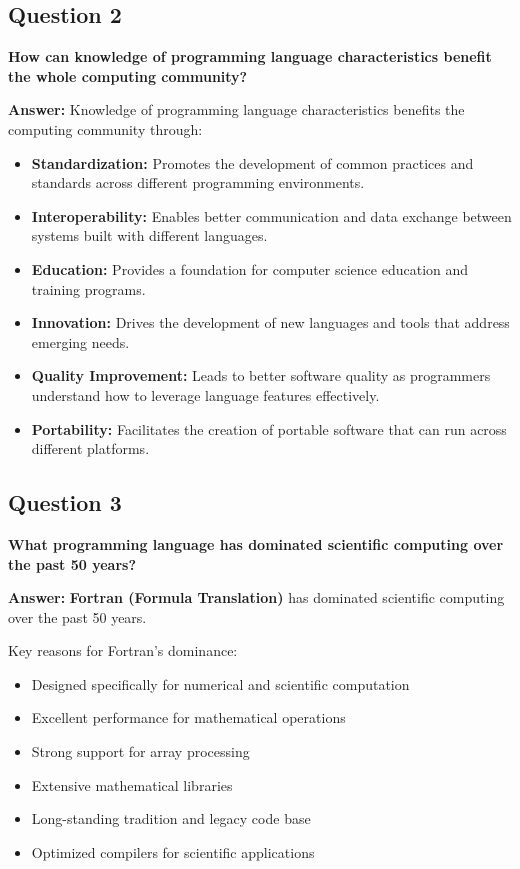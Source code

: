 \documentclass[11pt,a4paper]{article}
\begin{document}
\subsection{Question 2}
\textbf{How can knowledge of programming language characteristics benefit the whole computing community?}

\textbf{Answer:}
Knowledge of programming language characteristics benefits the computing community through:

\begin{itemize}
\item \textbf{Standardization:} Promotes the development of common practices and standards across different programming environments.

\item \textbf{Interoperability:} Enables better communication and data exchange between systems built with different languages.

\item \textbf{Education:} Provides a foundation for computer science education and training programs.

\item \textbf{Innovation:} Drives the development of new languages and tools that address emerging needs.

\item \textbf{Quality Improvement:} Leads to better software quality as programmers understand how to leverage language features effectively.

\item \textbf{Portability:} Facilitates the creation of portable software that can run across different platforms.
\end{itemize}

\subsection{Question 3}
\textbf{What programming language has dominated scientific computing over the past 50 years?}

\textbf{Answer:}
\textbf{Fortran (Formula Translation)} has dominated scientific computing over the past 50 years. 

Key reasons for Fortran's dominance:
\begin{itemize}
\item Designed specifically for numerical and scientific computation
\item Excellent performance for mathematical operations
\item Strong support for array processing
\item Extensive mathematical libraries
\item Long-standing tradition and legacy code base
\item Optimized compilers for scientific applications
\end{itemize}
\end{document}
